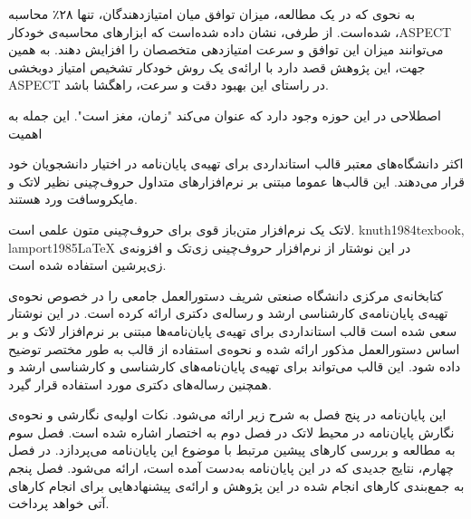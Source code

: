 به نحوی که در یک مطالعه،
میزان توافق میان امتیازدهندگان، تنها ۲۸٪ محاسبه شده‌است.
از طرفی، نشان داده شده‌است که ابزار‌های محاسبه‌ی خودکار ،ASPECT می‌توانند
میزان این توافق و سرعت امتیازدهی متخصصان را افزایش دهند.
به همین جهت، این پژوهش قصد دارد با ارائه‌ی یک روش خودکار تشخیص امتیاز دوبخشی ASPECT 
در راستای این بهبود دقت و سرعت، راهگشا باشد.

اصطلاحی در این حوزه وجود دارد که عنوان می‌کند "زمان، مغز است". 
این جمله به اهمیت 


اکثر دانشگاه‌های معتبر قالب استانداردی برای تهیه‌ی پایان‌نامه در اختیار دانشجویان خود قرار می‌دهند.
این قالب‌ها عموما مبتنی بر نرم‌افزارهای متداول حروف‌چینی نظیر لاتک و مایکروسافت ورد هستند.

 لاتک یک نرم‌افزار متن‌باز قوی برای حروف‌چینی متون علمی است.
 {knuth1984texbook, lamport1985LaTeX} 
در این نوشتار از نرم‌افزار حروف‌چینی زی‌تک 
 و افزونه‌ی زی‌پرشین
 استفاده شده است.



کتابخانه‌ی مرکزی دانشگاه صنعتی شریف دستورالعمل جامعی را در خصوص
نحوه‌ی تهیه‌ی پایان‌نامه‌ی کارشناسی ارشد و رساله‌ی دکتری ارائه کرده است.
در این نوشتار سعی شده است قالب استانداردی برای تهیه‌ی پایان‌نامه‌ها مبتنی بر نرم‌افزار لاتک و
بر اساس دستورالعمل مذکور ارائه شده و
نحوه‌ی استفاده از قالب به طور مختصر توضیح داده شود.
این قالب  می‌تواند برای تهیه‌ی پایان‌نامه‌های کارشناسی و کارشناسی ارشد 
و همچنین رساله‌ها‌ی دکتری مورد استفاده قرار گیرد.


این پایان‌نامه در پنج فصل به شرح زیر ارائه می‌شود.
نکات اولیه‌ی نگارشی و نحوه‌ی نگارش پایان‌نامه در محیط لاتک در  فصل دوم به اختصار اشاره شده است. 
فصل سوم به مطالعه و بررسی کارهای پیشین مرتبط با موضوع این پایان‌نامه می‌پردازد.
در فصل چهارم، نتایج جدیدی که در این پایان‌نامه به‌دست آمده است، ارائه می‌شود.
فصل پنجم به جمع‌بندی کارهای انجام شده در این پژوهش و ارائه‌ی پیشنهادهایی برای انجام کارهای آتی خواهد پرداخت.